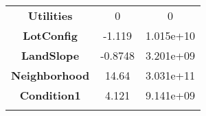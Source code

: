 \documentclass[]{article}
\begin{document}
\begin{longtable}[c]{@{}ccc@{}}
\begin{minipage}[t]{0.25\columnwidth}\centering\strut
\textbf{Utilities}
\strut\end{minipage} &
\begin{minipage}[t]{0.16\columnwidth}\centering\strut
0
\strut\end{minipage} &
\begin{minipage}[t]{0.19\columnwidth}\centering\strut
0
\strut\end{minipage}\tabularnewline
\begin{minipage}[t]{0.25\columnwidth}\centering\strut
\textbf{LotConfig}
\strut\end{minipage} &
\begin{minipage}[t]{0.16\columnwidth}\centering\strut
-1.119
\strut\end{minipage} &
\begin{minipage}[t]{0.19\columnwidth}\centering\strut
1.015e+10
\strut\end{minipage}\tabularnewline
\begin{minipage}[t]{0.25\columnwidth}\centering\strut
\textbf{LandSlope}
\strut\end{minipage} &
\begin{minipage}[t]{0.16\columnwidth}\centering\strut
-0.8748
\strut\end{minipage} &
\begin{minipage}[t]{0.19\columnwidth}\centering\strut
3.201e+09
\strut\end{minipage}\tabularnewline
\begin{minipage}[t]{0.25\columnwidth}\centering\strut
\textbf{Neighborhood}
\strut\end{minipage} &
\begin{minipage}[t]{0.16\columnwidth}\centering\strut
14.64
\strut\end{minipage} &
\begin{minipage}[t]{0.19\columnwidth}\centering\strut
3.031e+11
\strut\end{minipage}\tabularnewline
\begin{minipage}[t]{0.25\columnwidth}\centering\strut
\textbf{Condition1}
\strut\end{minipage} &
\begin{minipage}[t]{0.16\columnwidth}\centering\strut
4.121
\strut\end{minipage} &
\begin{minipage}[t]{0.19\columnwidth}\centering\strut
9.141e+09
\strut\end{minipage}\tabularnewline
\begin{minipage}[t]{0.25\columnwidth}\centering\strut

\end{minipage}
\end{longtable}
\end{document}
